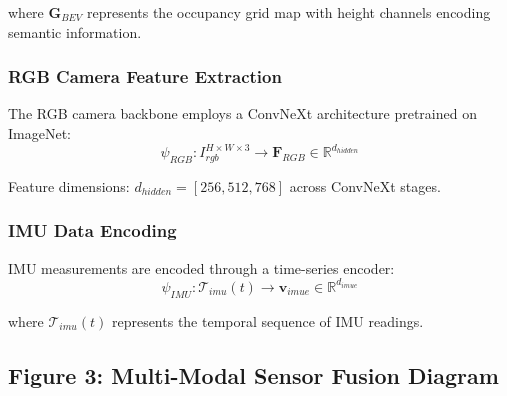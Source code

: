 \documentclass[10pt,a4paper,twocolumn]{article}
\begin{document}
where $\mathbf{G}_{BEV}$ represents the occupancy grid map with height channels encoding semantic information.

\subsubsection*{RGB Camera Feature Extraction}

The RGB camera backbone employs a ConvNeXt architecture pretrained on ImageNet:
\begin{equation}
    \psi_{RGB}: I_{rgb}^{H\times W\times 3} \rightarrow \mathbf{F}_{RGB} \in \mathbb{R}^{d_{hidden}}
\end{equation}

Feature dimensions: $d_{hidden} = [256, 512, 768]$ across ConvNeXt stages.

\subsubsection*{IMU Data Encoding}

IMU measurements are encoded through a time-series encoder:
\begin{equation}
    \psi_{IMU}: \mathcal{T}_{imu}(t) \rightarrow \mathbf{v}_{imue} \in \mathbb{R}^{d_{imue}}
\end{equation}

where $\mathcal{T}_{imu}(t)$ represents the temporal sequence of IMU readings.

\subsection*{Figure 3: Multi-Modal Sensor Fusion Diagram}
\end{document}
